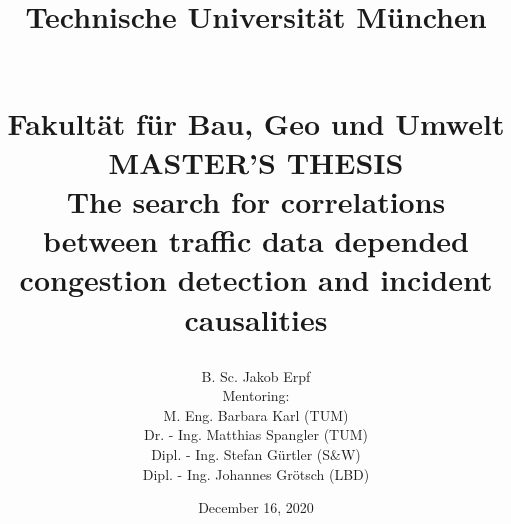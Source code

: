 \documentclass[a4paper,headsepline,footsepline,fontsize=11pt,BCOR=12mm,DIV=12]{report}
\begin{document}
\showthe\textwidth

\title{
\parbox{3cm}{}
Technische Universität München
\parbox{3cm}{}
\\
[0.3cm]
\smaller Fakultät für Bau, Geo und Umwelt\\
[2cm]
MASTER'S THESIS\\
[1cm]
\smaller The search for correlations between traffic data depended congestion detection and incident causalities}
\author{
B. Sc. Jakob Erpf\\ 
[1cm]
\small Mentoring:\\ 
\small M. Eng. Barbara Karl (TUM)\\ 
\small Dr. - Ing. Matthias Spangler (TUM)\\ 
\small Dipl. - Ing. Stefan Gürtler (S\&W)\\
\small Dipl. - Ing. Johannes Grötsch (LBD)
}
\date{December 16, 2020}
\maketitle
\end{document}
